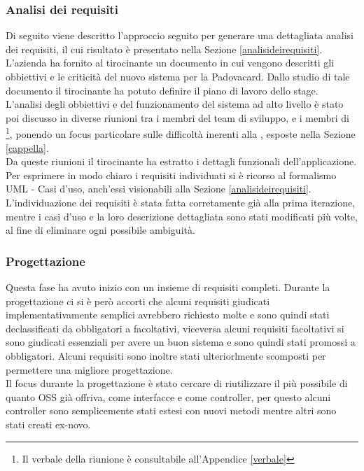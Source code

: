 \subsubsection{Analisi dei requisiti}
Di seguito viene descritto l'approccio seguito per generare una dettagliata analisi dei requisiti, il cui risultato è presentato nella Sezione \ref{analisideirequisiti}.
L'azienda \net ha fornito al tirocinante un documento in cui vengono descritti gli obbiettivi e le criticità del nuovo sistema per la Padovacard. Dallo studio di tale documento il tirocinante ha potuto definire il piano di lavoro dello stage.\\

L'analisi degli obbiettivi e del funzionamento del sistema ad alto livello è stato poi discusso in diverse riunioni tra i membri del team di sviluppo, e i membri di \charta \footnote{Il verbale della riunione è consultabile all'Appendice \ref{verbale}}, ponendo un focus particolare sulle difficoltà inerenti alla \cappella, esposte nella Sezione \ref{cappella}.\\

Da queste riunioni il tirocinante ha estratto i dettagli funzionali dell’applicazione.
Per esprimere in modo chiaro i requisiti individuati si è ricorso al formalismo UML - Casi d'uso, anch'essi visionabili alla Sezione \ref{analisideirequisiti}.\\

L'individuazione dei requisiti è stata fatta corretamente già alla prima iterazione, mentre i casi d'uso e la loro descrizione dettagliata sono stati modificati più volte, al fine di eliminare ogni possibile ambiguità.
\subsubsection{Progettazione}
Questa fase ha avuto inizio con un insieme di requisiti completi. Durante la progettazione ci si è però accorti che alcuni requisiti giudicati implementativamente semplici avrebbero richiesto molte  e sono quindi stati declassificati da obbligatori a facoltativi, viceversa alcuni requisiti facoltativi si sono giudicati essenziali per avere un buon sistema e sono quindi stati promossi a obbligatori. Alcuni requisiti sono inoltre stati ulteriorlmente scomposti per permettere una migliore progettazione. \\

Il focus durante la progettazione è stato cercare di riutilizzare il più possibile di quanto OSS già offriva, come interfacce e come controller, per questo alcuni controller sono semplicemente stati estesi con nuovi metodi mentre altri sono stati creati ex-novo.\\ 

